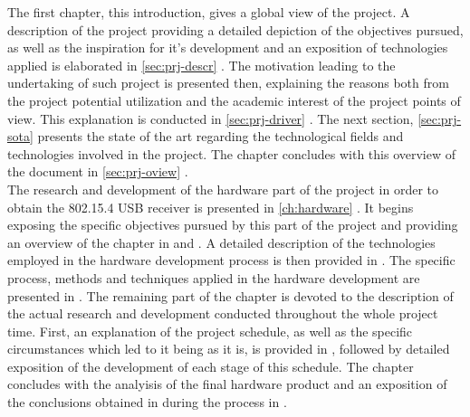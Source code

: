 		The first chapter, this introduction, gives a global view of the project. A description of the project providing a detailed depiction of the objectives pursued, as well as the inspiration for it's development and an exposition of technologies applied is elaborated in \autoref{sec:prj-descr} \emph{}. The motivation leading to the undertaking of such project is presented then, explaining the reasons both from the project potential utilization and the academic interest of the project points of view. This explanation is conducted in \autoref{sec:prj-driver} \emph{}. The next section, \autoref{sec:prj-sota} presents the state of the art regarding the technological fields and technologies involved in the project. The chapter concludes with this overview of the document in \autoref{sec:prj-oview} \emph{}.\\
		
		The research and development of the hardware part of the project in order to obtain the 802.15.4 USB receiver is presented in \autoref{ch:hardware} \emph{}. It begins exposing the specific objectives pursued by this part of the project and providing an overview of the chapter in  and . A detailed description of the technologies employed in the hardware development process is then provided in . The specific process, methods and techniques applied in the hardware development are presented in . The remaining part of the chapter is devoted to the description of the actual research and development conducted throughout the whole project time. First, an explanation of the project schedule, as well as the specific circumstances which led to it being as it is, is provided in , followed by detailed exposition of the development of each stage of this schedule. The chapter concludes with the analyisis of the final hardware product and an exposition of the conclusions obtained in during the process in .\\


